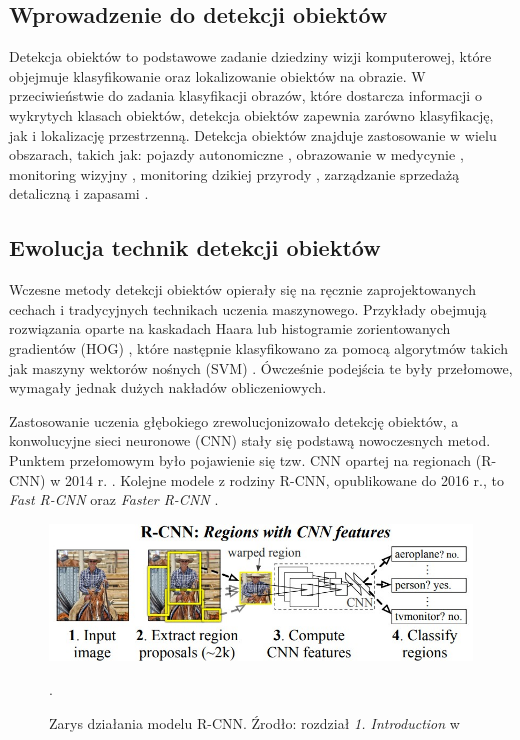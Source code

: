 \subsection{Wprowadzenie do detekcji obiektów}
Detekcja obiektów to podstawowe zadanie dziedziny wizji komputerowej, które objejmuje klasyfikowanie oraz lokalizowanie obiektów na obrazie. W przeciwieństwie do zadania klasyfikacji obrazów, które dostarcza informacji o wykrytych klasach obiektów, detekcja obiektów zapewnia zarówno klasyfikację, jak i lokalizację przestrzenną. Detekcja obiektów znajduje zastosowanie w wielu obszarach, takich jak: pojazdy autonomiczne \cite{pojazdy_autonomiczne}, obrazowanie w medycynie \cite{obrazowanie_w_medycynie}, monitoring wizyjny \cite{monitoring_wizyjny}, monitoring dzikiej przyrody \cite{wildlife}, zarządzanie sprzedażą detaliczną i zapasami \cite{sklepy}.

\subsection{Ewolucja technik detekcji obiektów}
Wczesne metody detekcji obiektów opierały się na ręcznie zaprojektowanych cechach i tradycyjnych technikach uczenia maszynowego. Przykłady obejmują rozwiązania oparte na kaskadach Haara \cite{haar} lub histogramie zorientowanych gradientów (HOG) \cite{hog}, które następnie klasyfikowano za pomocą algorytmów takich jak maszyny wektorów nośnych (SVM) \cite{svm}. Ówcześnie podejścia te były przełomowe, wymagały jednak dużych nakładów obliczeniowych.

Zastosowanie uczenia głębokiego zrewolucjonizowało detekcję obiektów, a konwolucyjne sieci neuronowe (CNN) stały się podstawą nowoczesnych metod. Punktem przełomowym było pojawienie się tzw. CNN opartej na regionach (R-CNN) w 2014 r. \cite{RCNN}. Kolejne modele z rodziny R-CNN, opublikowane do 2016 r., to \emph{Fast R-CNN} \cite{Fast-RCNN} oraz \emph{Faster R-CNN} \cite{Faster-RCNN}.
\begin{figure}[H]
    \centering
    \includegraphics[width=\linewidth]{r_technologie/AI_assets/rcnn.png}
    \caption{Zarys działania modelu R-CNN. Źrodło: rozdział \emph{1. Introduction} w \cite{RCNN}}.
    \label{fig:R-CNN-schemat}
\end{figure}


